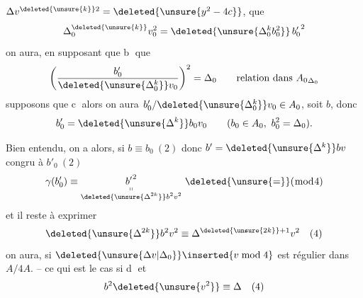   $\Delta v^{\deleted{\unsure{k}}2}=\deleted{\unsure{y^2-4c}}$,    que
\[
\Delta_0^{\deleted{\unsure{k}}}v_0^2=\deleted{\unsure{\Delta_0^k b_0^2}}\,{b'_0}^{2}
\]
on aura, en supposant que \textcircled{\scriptsize b}  que
\[
\left(\frac{b'_0}{\deleted{\unsure{\Delta_0^k}}v_0}\right)^2=\Delta_0\qquad
\text{relation dans }{A_0}_{\Delta_0}
\]
supposons que \textcircled{\scriptsize c} alors on aura $b'_0/\deleted{\unsure{\Delta_0^k}}v_0\in A_0$, soit $b$, donc
\[
b'_0=\deleted{\unsure{\Delta^k}}b_0v_0\qquad(b_0\in A_0,\ b_0^2=\Delta_0).
\]

Bien entendu, on a alors, si $b\equiv b_0\ (2)$ donc $b'=\deleted{\unsure{\Delta^k}}bv$ congru à $b'_0\ (2)$
\[
\gamma(b'_0)\equiv\underset{\substack{\shortparallel\\\deleted{\unsure{\Delta^{2k}}} b^2v^2}}{ {b'}^2}\ \deleted{\unsure{=}}(\bmod 4)
\]
et il reste à exprimer
\[
\deleted{\unsure{\Delta^{2k}}}b^2v^2\equiv\Delta^{\deleted{\unsure{2k}}+1}v^2\quad(4)
\]
on aura, si $\deleted{\unsure{\Delta v|\Delta_0}}\inserted{v\bmod4}$ est régulier dans $A/4A$. -- ce qui est le cas si \textcircled{\scriptsize d} et  
\[
b^2\deleted{\unsure{v^2}}\equiv\Delta\quad(4)
\]
